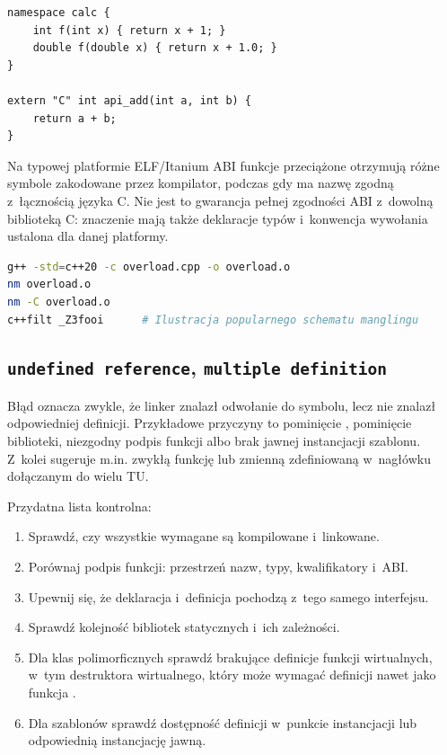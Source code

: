 \begin{lstlisting}[caption={Przeciazanie i punkt wejscia C ABI.}]
namespace calc {
    int f(int x) { return x + 1; }
    double f(double x) { return x + 1.0; }
}

extern "C" int api_add(int a, int b) {
    return a + b;
}
\end{lstlisting}

Na typowej platformie ELF/Itanium ABI funkcje przeciążone otrzymują
różne symbole zakodowane przez kompilator, podczas gdy 
ma nazwę zgodną z~łącznością języka C. Nie jest to gwarancja pełnej
zgodności ABI z~dowolną biblioteką C: znaczenie mają także deklaracje
typów i~konwencja wywołania ustalona dla danej platformy.

\begin{lstlisting}[language=bash,caption={Demanglowanie i inspekcja symboli (przykłady narzędziowe).}]
g++ -std=c++20 -c overload.cpp -o overload.o
nm overload.o
nm -C overload.o
c++filt _Z3fooi      # Ilustracja popularnego schematu manglingu
\end{lstlisting}

\subsection{\texttt{undefined reference}, \texttt{multiple definition}}

Błąd  oznacza zwykle, że linker znalazł
odwołanie do symbolu, lecz nie znalazł odpowiedniej definicji.
Przykładowe przyczyny to pominięcie , pominięcie
biblioteki, niezgodny podpis funkcji albo brak jawnej instancjacji
szablonu. Z~kolei  sugeruje m.in. zwykłą
funkcję lub zmienną zdefiniowaną w~nagłówku dołączanym do wielu TU.

Przydatna lista kontrolna:
\begin{enumerate}
\item Sprawdź, czy wszystkie wymagane  są kompilowane i~linkowane.
\item Porównaj podpis funkcji: przestrzeń nazw, typy, kwalifikatory i~ABI.
\item Upewnij się, że deklaracja i~definicja pochodzą z~tego samego interfejsu.
\item Sprawdź kolejność bibliotek statycznych i~ich zależności.
\item Dla klas polimorficznych sprawdź brakujące definicje funkcji
      wirtualnych, w~tym destruktora wirtualnego, który może wymagać
      definicji nawet jako funkcja .
\item Dla szablonów sprawdź dostępność definicji w~punkcie instancjacji
      lub odpowiednią instancjację jawną.
\end{enumerate}

